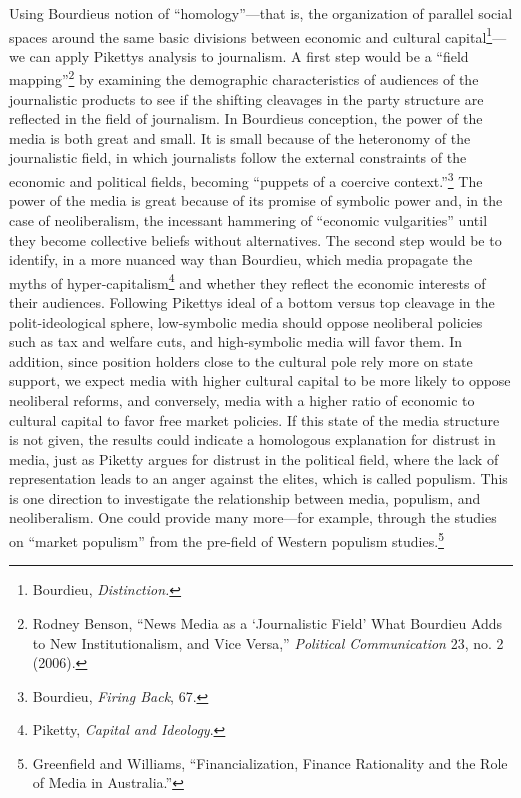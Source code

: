 \documentclass{tufte-handout}
\begin{document}
{{{{Using Bourdieu\textquotesingle s notion of ``homology''---that is, the
organization of parallel social spaces around the same basic divisions
between economic and cultural capital\footnote{Bourdieu,
  \emph{Distinction.}}---we can apply Piketty\textquotesingle s analysis
to journalism. A first step would be a ``field mapping''\footnote{Rodney
  Benson, ``News Media as a `Journalistic Field' What Bourdieu Adds to
  New Institutionalism, and Vice Versa,'' \emph{Political Communication}
  23, no. 2 (2006).} by examining the demographic characteristics of
audiences of the journalistic products to see if the shifting cleavages
in the party structure are reflected in the field of journalism. In
Bourdieu\textquotesingle s conception, the power of the media is both
great and small. It is small because of the heteronomy of the
journalistic field, in which journalists follow the external constraints
of the economic and political fields, becoming ``puppets of a coercive
context.''\footnote{Bourdieu, \emph{Firing Back}, 67.} The power of the
media is great because of its promise of symbolic power and, in the case
of neoliberalism, the incessant hammering of ``economic vulgarities''
until they become collective beliefs without alternatives. The second
step would be to identify, in a more nuanced way than Bourdieu, which
media propagate the myths of hyper-capitalism\footnote{Piketty,
  \emph{Capital and Ideology}.} and whether they reflect the economic
interests of their audiences. Following Piketty\textquotesingle s ideal
of a bottom versus top cleavage in the polit-ideological sphere,
low-symbolic media should oppose neoliberal policies such as tax and
welfare cuts, and high-symbolic media will favor them. In addition,
since position holders close to the cultural pole rely more on state
support, we expect media with higher cultural capital to be more likely
to oppose neoliberal reforms, and conversely, media with a higher ratio
of economic to cultural capital to favor free market policies. If this
state of the media structure is not given, the results could indicate a
homologous explanation for distrust in media, just as Piketty argues for
distrust in the political field, where the lack of representation leads
to an anger against the elites, which is called populism. This is one
direction to investigate the relationship between media, populism, and
neoliberalism. One could provide many more---for example, through the
studies on ``market populism'' from the pre-field of Western populism
studies.\footnote{Greenfield and Williams, ``Financialization, Finance
  Rationality and the Role of Media in Australia.''}

}}}}
\end{document}
